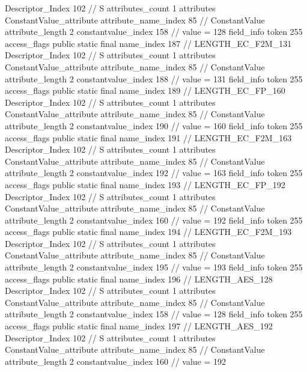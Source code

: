 {{{{{				Descriptor_Index	102		// S
				attributes_count	1
				attributes {
				ConstantValue_attribute {
					attribute_name_index	85		// ConstantValue
					attribute_length	2
					constantvalue_index	158		// value = 128
				}
				}
			}
			field_info {
				token	255
				access_flags	public static final
				name_index	187		// LENGTH_EC_F2M_131
				Descriptor_Index	102		// S
				attributes_count	1
				attributes {
				ConstantValue_attribute {
					attribute_name_index	85		// ConstantValue
					attribute_length	2
					constantvalue_index	188		// value = 131
				}
				}
			}
			field_info {
				token	255
				access_flags	public static final
				name_index	189		// LENGTH_EC_FP_160
				Descriptor_Index	102		// S
				attributes_count	1
				attributes {
				ConstantValue_attribute {
					attribute_name_index	85		// ConstantValue
					attribute_length	2
					constantvalue_index	190		// value = 160
				}
				}
			}
			field_info {
				token	255
				access_flags	public static final
				name_index	191		// LENGTH_EC_F2M_163
				Descriptor_Index	102		// S
				attributes_count	1
				attributes {
				ConstantValue_attribute {
					attribute_name_index	85		// ConstantValue
					attribute_length	2
					constantvalue_index	192		// value = 163
				}
				}
			}
			field_info {
				token	255
				access_flags	public static final
				name_index	193		// LENGTH_EC_FP_192
				Descriptor_Index	102		// S
				attributes_count	1
				attributes {
				ConstantValue_attribute {
					attribute_name_index	85		// ConstantValue
					attribute_length	2
					constantvalue_index	160		// value = 192
				}
				}
			}
			field_info {
				token	255
				access_flags	public static final
				name_index	194		// LENGTH_EC_F2M_193
				Descriptor_Index	102		// S
				attributes_count	1
				attributes {
				ConstantValue_attribute {
					attribute_name_index	85		// ConstantValue
					attribute_length	2
					constantvalue_index	195		// value = 193
				}
				}
			}
			field_info {
				token	255
				access_flags	public static final
				name_index	196		// LENGTH_AES_128
				Descriptor_Index	102		// S
				attributes_count	1
				attributes {
				ConstantValue_attribute {
					attribute_name_index	85		// ConstantValue
					attribute_length	2
					constantvalue_index	158		// value = 128
				}
				}
			}
			field_info {
				token	255
				access_flags	public static final
				name_index	197		// LENGTH_AES_192
				Descriptor_Index	102		// S
				attributes_count	1
				attributes {
				ConstantValue_attribute {
					attribute_name_index	85		// ConstantValue
					attribute_length	2
					constantvalue_index	160		// value = 192
}}}}}}}
